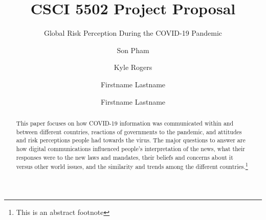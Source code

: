 \documentclass[11pt,sigconf]{acmart}
\begin{document}
\title{CSCI 5502 Project Proposal}
\subtitle{Global Risk Perception During the COVID-19 Pandemic}

\author{Son Pham}

\author{Kyle Rogers}

\author{Firstname Lastname}

\author{Firstname Lastname}


\renewcommand{\shortauthors}{S. Pham, K. Rogers, Reiko, and Ryan}


\begin{abstract}
This paper focuses on how COVID-19 information was communicated within and between different countries, reactions of governments to the pandemic, and attitudes and risk perceptions people had towards the virus. The major questions to answer are how digital communications influenced people’s interpretation of the news, what their responses were to the new laws and mandates, their beliefs and concerns about it versus other world issues, and the similarity and trends among the different countries.\footnote{This is an abstract footnote}
\end{abstract}
\end{document}
